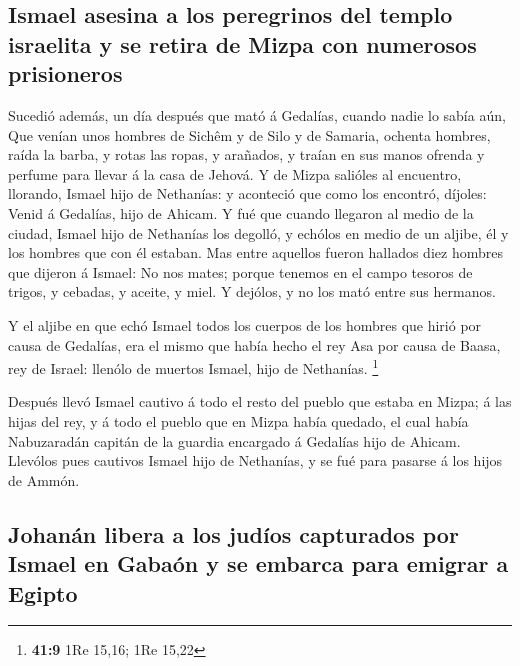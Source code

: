 \hypertarget{ismael-asesina-a-los-peregrinos-del-templo-israelita-y-se-retira-de-mizpa-con-numerosos-prisioneros}{%
\subsection{Ismael asesina a los peregrinos del templo israelita y se
retira de Mizpa con numerosos
prisioneros}\label{ismael-asesina-a-los-peregrinos-del-templo-israelita-y-se-retira-de-mizpa-con-numerosos-prisioneros}}

 Sucedió además, un día después que mató á Gedalías, cuando
nadie lo sabía aún,  Que venían unos hombres de Sichêm y de
Silo y de Samaria, ochenta hombres, raída la barba, y rotas las ropas, y
arañados, y traían en sus manos ofrenda y perfume para llevar á la casa
de Jehová.  Y de Mizpa salióles al encuentro, llorando,
Ismael hijo de Nethanías: y aconteció que como los encontró, díjoles:
Venid á Gedalías, hijo de Ahicam.  Y fué que cuando llegaron
al medio de la ciudad, Ismael hijo de Nethanías los degolló, y echólos
en medio de un aljibe, él y los hombres que con él estaban. 
Mas entre aquellos fueron hallados diez hombres que dijeron á Ismael: No
nos mates; porque tenemos en el campo tesoros de trigos, y cebadas, y
aceite, y miel. Y dejólos, y no los mató entre sus hermanos.

 Y el aljibe en que echó Ismael todos los cuerpos de los
hombres que hirió por causa de Gedalías, era el mismo que había hecho el
rey Asa por causa de Baasa, rey de Israel: llenólo de muertos Ismael,
hijo de Nethanías. \footnote{\textbf{41:9} 1Re 15,16; 1Re 15,22}

 Después llevó Ismael cautivo á todo el resto del pueblo
que estaba en Mizpa; á las hijas del rey, y á todo el pueblo que en
Mizpa había quedado, el cual había Nabuzaradán capitán de la guardia
encargado á Gedalías hijo de Ahicam. Llevólos pues cautivos Ismael hijo
de Nethanías, y se fué para pasarse á los hijos de Ammón.

\hypertarget{johanuxe1n-libera-a-los-juduxedos-capturados-por-ismael-en-gabauxf3n-y-se-embarca-para-emigrar-a-egipto}{%
\subsection{Johanán libera a los judíos capturados por Ismael en Gabaón
y se embarca para emigrar a
Egipto}\label{johanuxe1n-libera-a-los-juduxedos-capturados-por-ismael-en-gabauxf3n-y-se-embarca-para-emigrar-a-egipto}}

